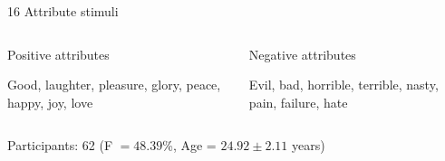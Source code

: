 \documentclass[compress]{beamer}
\begin{document}
\begin{frame}
\begin{block}{16 Attribute stimuli}
	\begin{columns}[T]
	\begin{column}{.50\linewidth}
		\begin{center}
			\color{rasch}Positive attributes
		\end{center}
		
		Good, laughter, pleasure, glory, peace, happy, joy, love
	\end{column}
	
	\begin{column}{.50\linewidth}
		\begin{center}
			\color{alert}Negative attributes
		\end{center}
		
		Evil, bad, horrible, terrible, nasty, pain, failure, hate
	\end{column}
\end{columns}
	\end{block}
	\vspace{1.2mm}
	Participants: 62 (F $=48.39$\%, Age = $24.92\pm2.11$ years)

\end{frame}
\end{document}
